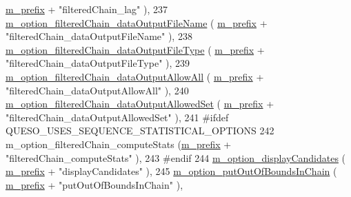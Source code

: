 \begin{DoxyCode}
      \hyperlink{class_q_u_e_s_o_1_1_metropolis_hastings_s_g_options_a4f7c510aaa530336d24259e2a89f5d0b}{m\_prefix} + \textcolor{stringliteral}{"filteredChain\_lag"}                         ),
237   \hyperlink{class_q_u_e_s_o_1_1_metropolis_hastings_s_g_options_a340a0e9c2b5c2bec86d143cb0f8d64f6}{m\_option\_filteredChain\_dataOutputFileName}          (
      \hyperlink{class_q_u_e_s_o_1_1_metropolis_hastings_s_g_options_a4f7c510aaa530336d24259e2a89f5d0b}{m\_prefix} + \textcolor{stringliteral}{"filteredChain\_dataOutputFileName"}          ),
238   \hyperlink{class_q_u_e_s_o_1_1_metropolis_hastings_s_g_options_aca1e9af38b6ef1b83bf1fda6477404c4}{m\_option\_filteredChain\_dataOutputFileType}          (
      \hyperlink{class_q_u_e_s_o_1_1_metropolis_hastings_s_g_options_a4f7c510aaa530336d24259e2a89f5d0b}{m\_prefix} + \textcolor{stringliteral}{"filteredChain\_dataOutputFileType"}          ),
239   \hyperlink{class_q_u_e_s_o_1_1_metropolis_hastings_s_g_options_a7317db52b0866c8895ad1a16d4a4b337}{m\_option\_filteredChain\_dataOutputAllowAll}          (
      \hyperlink{class_q_u_e_s_o_1_1_metropolis_hastings_s_g_options_a4f7c510aaa530336d24259e2a89f5d0b}{m\_prefix} + \textcolor{stringliteral}{"filteredChain\_dataOutputAllowAll"}          ),
240   \hyperlink{class_q_u_e_s_o_1_1_metropolis_hastings_s_g_options_a361df3110aea27f35465dedac372a90f}{m\_option\_filteredChain\_dataOutputAllowedSet}        (
      \hyperlink{class_q_u_e_s_o_1_1_metropolis_hastings_s_g_options_a4f7c510aaa530336d24259e2a89f5d0b}{m\_prefix} + \textcolor{stringliteral}{"filteredChain\_dataOutputAllowedSet"}        ),
241 \textcolor{preprocessor}{#ifdef QUESO\_USES\_SEQUENCE\_STATISTICAL\_OPTIONS}
242 \textcolor{preprocessor}{}  m\_option\_filteredChain\_computeStats                (\hyperlink{class_q_u_e_s_o_1_1_metropolis_hastings_s_g_options_a4f7c510aaa530336d24259e2a89f5d0b}{m\_prefix} + \textcolor{stringliteral}{"filteredChain\_computeStats"}      
                ),
243 \textcolor{preprocessor}{#endif}
244 \textcolor{preprocessor}{}  \hyperlink{class_q_u_e_s_o_1_1_metropolis_hastings_s_g_options_a7881fafcf3caa7bf33d20ff0a7576944}{m\_option\_displayCandidates}                         (
      \hyperlink{class_q_u_e_s_o_1_1_metropolis_hastings_s_g_options_a4f7c510aaa530336d24259e2a89f5d0b}{m\_prefix} + \textcolor{stringliteral}{"displayCandidates"}                         ),
245   \hyperlink{class_q_u_e_s_o_1_1_metropolis_hastings_s_g_options_a6d1856b0435c6dfcac6b75ec36829b47}{m\_option\_putOutOfBoundsInChain}                     (
      \hyperlink{class_q_u_e_s_o_1_1_metropolis_hastings_s_g_options_a4f7c510aaa530336d24259e2a89f5d0b}{m\_prefix} + \textcolor{stringliteral}{"putOutOfBoundsInChain"}                     ),

\end{DoxyCode}
